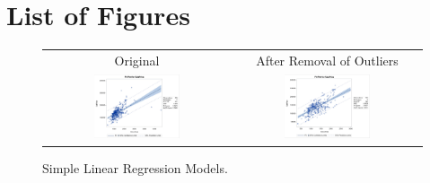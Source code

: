 \documentclass[11pt]{scrartcl} %
\begin{document}
\section{List of Figures}
\label{sec:Figures} 
\begin{figure}[H] %
	\centering
	\begin{tabular}{p{} p{}}
	\hline
	\multicolumn{1}{|c|}{Original} & \multicolumn{1}{|c|}{After Removal of Outliers} \\
		\multicolumn{1}{|c|}{\includegraphics[width=0.48\textwidth]{../graphics/A1LR1}} &
		\multicolumn{1}{|c|}{\includegraphics[width=0.48\textwidth]{../graphics/A1LR2}}\\
		\hline
	\end{tabular}		
	\caption{Simple Linear Regression Models.} %
	\label{fig:A1LR}
\end{figure}
\end{document}

